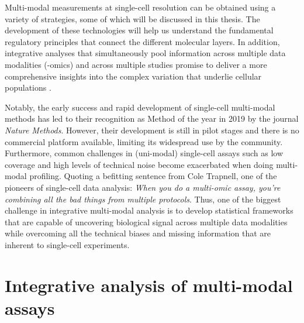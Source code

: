 Multi-modal measurements at single-cell resolution can be obtained using a variety of strategies, some of which will be discussed in this thesis. The development of these technologies will help us understand the fundamental regulatory principles that connect the different molecular layers. In addition, integrative analyses that simultaneously pool information across multiple data modalities (-omics) and across multiple studies promise to deliver a more comprehensive insights into the complex variation that underlie cellular populations \cite{Stuart2019,Colome-Tatche2018}.

Notably, the early success and rapid development of single-cell multi-modal methods has led to their recognition as Method of the year in 2019 by the journal \textit{Nature Methods}. However, their development is still in pilot stages and there is no commercial platform available, limiting its widespread use by the community. Furthermore, common challenges in (uni-modal) single-cell assays such as low coverage and high levels of technical noise become exacerbated when doing multi-modal profiling. Quoting a befitting sentence from Cole Trapnell, one of the pioneers of single-cell data analysis: \textit{When you do a multi-omic assay, you're combining all the bad things from multiple protocols}. Thus, one of the biggest challenge in integrative multi-modal analysis is to develop statistical frameworks that are capable of uncovering biological signal across multiple data modalities while overcoming all the technical biases and missing information that are inherent to single-cell experiments. 


\section{Integrative analysis of multi-modal assays}

